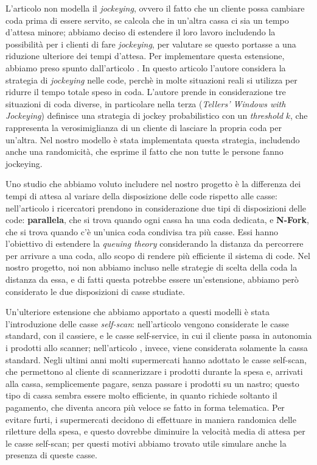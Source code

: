 L'articolo \cite{article1} non modella il \textit{jockeying}, ovvero il fatto che un cliente possa cambiare coda prima di essere servito, se calcola che in un'altra cassa ci sia un tempo d'attesa minore; abbiamo deciso di estendere il loro lavoro includendo la possibilità per i clienti di fare \textit{jockeying}, per valutare se questo portasse a una riduzione ulteriore dei tempi d'attesa. Per implementare questa estensione, abbiamo preso spunto dall'articolo \cite{koenigsberg1966jockeying}.
In questo articolo l'autore considera la strategia di \textit{jockeying} nelle code, perchè in molte situazioni reali si utilizza per ridurre il tempo totale speso in coda. L'autore prende in considerazione tre situazioni di coda diverse, in particolare nella terza (\textit{Tellers' Windows with Jockeying}) definisce una strategia di jockey probabilistico con un \textit{threshold} $k$, che rappresenta la verosimiglianza di un cliente di lasciare la propria coda per un'altra. Nel nostro modello è stata implementata questa strategia, includendo anche una randomicità, che esprime il fatto che non tutte le persone fanno jockeying.

Uno studio che abbiamo voluto includere nel nostro progetto è la differenza dei tempi di attesa al variare della disposizione delle code rispetto alle casse: nell'articolo \cite{yanagisawa2011methods} i ricercatori prendono in considerazione due tipi di disposizioni delle code: \textbf{parallela}, che si trova quando ogni cassa ha una coda dedicata, e \textbf{N-Fork}, che si trova quando c'è un'unica coda condivisa tra più casse. Essi hanno l'obiettivo di estendere la \textit{queuing theory} considerando la distanza da percorrere per arrivare a una coda, allo scopo di rendere più efficiente il sistema di code. Nel nostro progetto, noi non abbiamo incluso nelle strategie di scelta della coda la distanza da essa, e di fatti questa potrebbe essere un'estensione, abbiamo però considerato le due disposizioni di casse studiate. 

Un'ulteriore estensione che abbiamo apportato a questi modelli è stata l'introduzione delle casse \textit{self-scan}: nell'articolo \cite{article1} vengono considerate le casse standard, con il cassiere, e le casse self-service, in cui il cliente passa in autonomia i prodotti allo scanner; nell'articolo \cite{yanagisawa2011methods}, invece, viene considerata solamente la cassa standard. Negli ultimi anni molti supermercati hanno adottato le casse self-scan, che permettono al cliente di scannerizzare i prodotti durante la spesa e, arrivati alla cassa, semplicemente pagare, senza passare i prodotti su un nastro; questo tipo di cassa sembra essere molto efficiente, in quanto richiede soltanto il pagamento, che diventa ancora più veloce se fatto in forma telematica.  Per evitare furti, i supermercati decidono di effettuare in maniera randomica delle riletture della spesa, e questo dovrebbe diminuire la velocità media di attesa per le casse self-scan; per questi motivi abbiamo trovato utile simulare anche la presenza di queste casse.

